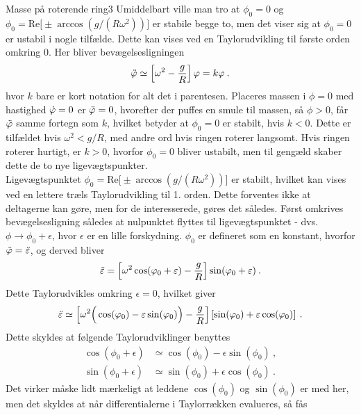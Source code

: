 \begin{opgave}{Masse på roterende ring}{3}
Umiddelbart ville man tro at $\phi_0=0$ og $\phi_0=\mathrm{Re}\big[\pm\arccos(g/(R\omega^2))\big]$ er stabile begge to, men det viser sig at $\phi_0=0$ er ustabil i nogle tilfælde. Dette kan vises ved en Taylorudvikling til første orden omkring $0$. Her bliver bevægelsesligningen
\begin{align*}
	\ddot{\varphi} \simeq \left[\omega^2 - \frac{g}{R}\right]\varphi = k\varphi \: .
\end{align*}
hvor $k$ bare er kort notation for alt det i parentesen. Placeres massen i $\phi = 0$ med hastighed $\dot{\varphi}=0$ er $\ddot{\varphi}=0$, hvorefter der puffes en smule til massen, så $\phi>0$, får $\ddot{\varphi}$ samme fortegn som $k$, hvilket betyder at $\phi_0 = 0$ er stabilt, hvis $k<0$. Dette er tilfældet hvis $\omega^2<g/R$, med andre ord hvis ringen roterer langsomt. Hvis ringen roterer hurtigt, er $k>0$, hvorfor $\phi_0=0$ bliver ustabilt, men til gengæld skaber dette de to nye ligevægtspunkter. \vspace{2mm}\\
Ligevægtspunktet $\phi_0=\mathrm{Re}\big[\pm\arccos(g/(R\omega^2))\big]$ er stabilt, hvilket kan vises ved en lettere træls Taylorudvikling til 1. orden. Dette forventes ikke at deltagerne kan gøre, men for de interesserede, gøres det således. Først omkrives bevægelsesligning således at nulpunktet flyttes til ligevægtspunktet - dvs. $\phi \rightarrow \phi_0 + \epsilon$, hvor $\epsilon$ er en lille forskydning. $\phi_0$ er defineret som en konstant, hvorfor $\ddot{\varphi} = \ddot{\varepsilon}$, og derved bliver 
\begin{align*}
	\ddot{\varepsilon} = \left[\omega^2\cos(\varphi_0 + \varepsilon) - \frac{g}{R}\right]\sin(\varphi_0 + \varepsilon) \: .
\end{align*}
Dette Taylorudvikles omkring $\epsilon=0$, hvilket giver
\begin{align} \label{eq:epsilon}
	\ddot{\varepsilon} \simeq \left[\omega^2\Big(\cos(\varphi_0)-\varepsilon\sin(\varphi_0)\Big) - \frac{g}{R}\right]\left[\sin(\varphi_0) + \varepsilon\cos(\varphi_0)\right] \: .
\end{align}
Dette skyldes at følgende Taylorudviklinger benyttes
\begin{align*}
	\cos(\phi_0 + \epsilon) &\simeq \cos(\phi_0) - \epsilon\sin(\phi_0) \: , \\
	\sin(\phi_0 + \epsilon) &\simeq \sin(\phi_0) + \epsilon\cos(\phi_0) \: .
\end{align*}
Det virker måske lidt mærkeligt at leddene $\cos(\phi_0)$ og $\sin(\phi_0)$ er med her, men det skyldes at når differentialerne i Taylorrækken evalueres, så fås

\end{opgave}
